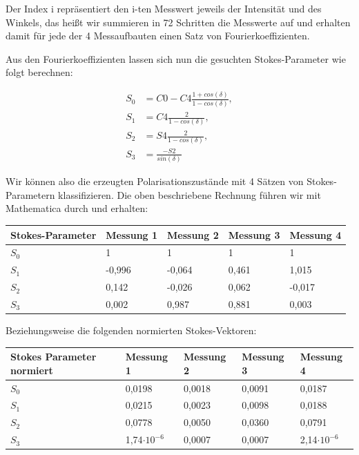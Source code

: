 \documentclass[bigchapter,colorback,accentcolor=tud4b,linedtoc,11pt]{tudreport}
\begin{document}
Der Index i repräsentiert den i-ten Messwert jeweils der Intensität und des Winkels, das heißt wir summieren in 72 Schritten die Messwerte auf und erhalten damit für jede der 4 Messaufbauten einen Satz von Fourierkoeffizienten.

Aus den Fourierkoeffizienten lassen sich nun die gesuchten Stokes-Parameter wie folgt berechnen: 

\begin{align*}
 S_0 &= C0 - C4 \frac{1 + cos(\delta)}{1 - cos(\delta)},\\ 
 S_1 &= C4 \frac{2}{1 - cos(\delta)},\\
 S_2 &= S4 \frac{2}{1 - cos(\delta)},\\
 S_3 &= \frac{-S2}{sin(\delta)} 
\end{align*}

Wir können also die erzeugten Polarisationszustände mit 4 Sätzen von Stokes-Parametern klassifizieren. Die oben beschriebene Rechnung führen wir mit Mathematica durch und erhalten: 

\begin{center}
  \begin{tabular}{|p{3cm}|p{3cm}|p{3cm}|p{3cm}|p{3cm}|}
    \hline
        Stokes-Parameter & Messung 1 & Messung 2 & Messung 3 & Messung 4 \\ \hline
        $S_0$ & 1 & 1 & 1 & 1 \\ \hline
        $S_1$ & -0,996 & -0,064 & 0,461 & 1,015 \\ \hline
        $S_2$ & 0,142 & -0,026 & 0,062 & -0,017 \\ \hline
        $S_3$ & 0,002 & 0,987 & 0,881 & 0,003 \\ \hline
\end{tabular}
\end{center}

Beziehungsweise die folgenden normierten Stokes-Vektoren:

\begin{center}
  \begin{tabular}{|p{3cm}|p{3cm}|p{3cm}|p{3cm}|p{3cm}|}
    \hline
        Stokes Parameter normiert & Messung 1 & Messung 2 & Messung 3 & Messung 4 \\ \hline
        $S_0$ & 0,0198 & 0,0018 & 0,0091 & 0,0187 \\ \hline
        $S_1$ & 0,0215 & 0,0023 & 0,0098 & 0,0188 \\ \hline
        $S_2$ & 0,0778 & 0,0050 & 0,0360 & 0,0791 \\ \hline
        $S_3$ & 1,74$\cdot 10^{-6}$ & 0,0007 & 0,0007 & 2,14$\cdot 10^{-6}$ \\ \hline
\end{tabular}
\end{center}
\end{document}
